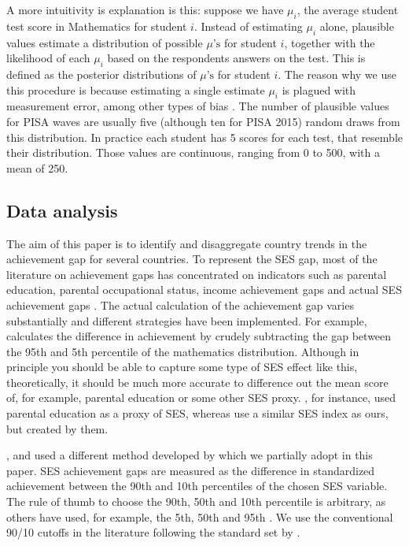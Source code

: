 \documentclass[11pt, a4paper]{article}\usepackage[]{graphicx}\usepackage[]{color}
\begin{document}
A more intuitivity is explanation is this: suppose we have \(\mu_i\), the average student test score in Mathematics for student \(i\). Instead of estimating \(\mu_i\) alone, plausible values estimate a distribution of possible \(\mu\text{'s}\) for student \(i\), together with the likelihood of each \(\mu_i\) based on the respondents answers on the test. This is defined as the posterior distributions of \(\mu\text{'s}\) for student \(i\). The reason why we use this procedure is because estimating a single estimate \(\mu_i\) is plagued with measurement error, among other types of bias \citep[see][]{wu2005}. The number of plausible values for PISA waves are usually five (although ten for PISA 2015) random draws from this distribution. In practice each student has 5 scores for each test, that resemble their distribution. Those values are continuous, ranging from 0 to 500, with a mean of 250.

\subsection{Data analysis}

The aim of this paper is to identify and disaggregate country trends in the achievement gap for several countries. To represent the SES gap, most of the literature on achievement gaps has concentrated on indicators such as parental education, parental occupational status, income achievement gaps and actual SES achievement gaps \citep{fryer2004, hanushek_woesmann_tracking, saw2016, bradbury2015, byun2010}. The actual calculation of the achievement gap varies substantially and different strategies have been implemented. For example, \citet{micklewright} calculates the difference in achievement by crudely subtracting the gap between the 95th and 5th percentile of the mathematics distribution. Although in principle you should be able to capture some type of SES effect like this, theoretically, it should be much more accurate to difference out the mean score of, for example, parental education or some other SES proxy. \citet{saw2016}, for instance, used parental education as a proxy of SES, whereas \citet{byun2010} use a similar SES index as ours, but created by them.

\citet{reardon_portilla}, \citet{anna2016} and \citet{anna2016_global} used a different method developed by \citet{reardon2011} which we partially adopt in this paper. SES achievement gaps are measured as the difference in standardized achievement between the 90th and 10th percentiles of the chosen SES variable. The rule of thumb to choose the 90th, 50th and 10th percentile is arbitrary, as others have used, for example, the 5th, 50th and 95th \citep{micklewright}. We use the conventional 90/10 cutoffs in the literature following the standard set by \citet{reardon2011}.
\end{document}

